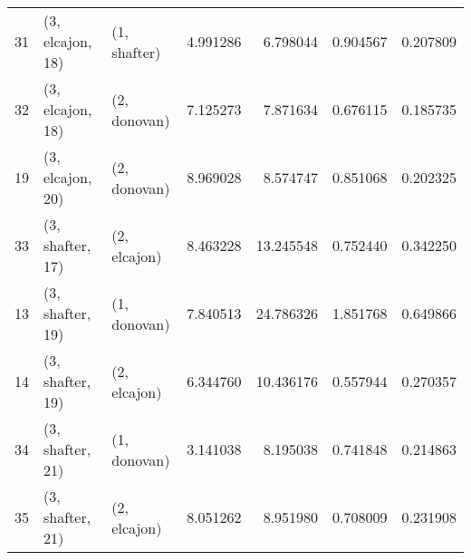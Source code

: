 \begin{tabular}{lllrrrr}
31 &  (3, elcajon, 18) &     (1, shafter) &   4.991286 &   6.798044 &   0.904567 &  0.207809 \\
32 &  (3, elcajon, 18) &     (2, donovan) &   7.125273 &   7.871634 &   0.676115 &  0.185735 \\
19 &  (3, elcajon, 20) &     (2, donovan) &   8.969028 &   8.574747 &   0.851068 &  0.202325 \\
33 &  (3, shafter, 17) &     (2, elcajon) &   8.463228 &  13.245548 &   0.752440 &  0.342250 \\
13 &  (3, shafter, 19) &     (1, donovan) &   7.840513 &  24.786326 &   1.851768 &  0.649866 \\
14 &  (3, shafter, 19) &     (2, elcajon) &   6.344760 &  10.436176 &   0.557944 &  0.270357 \\
34 &  (3, shafter, 21) &     (1, donovan) &   3.141038 &   8.195038 &   0.741848 &  0.214863 \\
35 &  (3, shafter, 21) &     (2, elcajon) &   8.051262 &   8.951980 &   0.708009 &  0.231908 \\
\bottomrule
\end{tabular}
